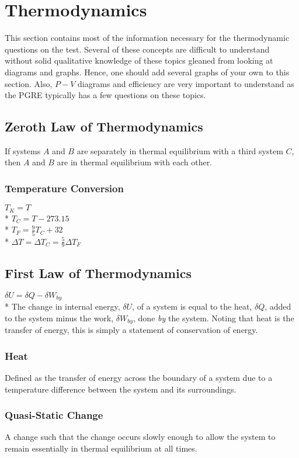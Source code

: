\section{Thermodynamics}
This section contains most of the information necessary for the thermodynamic questions on the test.
Several of these concepts are difficult to understand without solid qualitative knowledge of these topics gleaned from looking at diagrams and graphs.
Hence, one should add several graphs of your own to this section.
Also, \(P-V\) diagrams and efficiency are very important to understand as the PGRE typically has a few questions on these topics.

\subsection{Zeroth Law of Thermodynamics}
If systems \(A\) and \(B\) are separately in thermal equilibrium with a third system \(C\), then \(A\) and \(B\) are in thermal equilibrium with each other.

\subsubsection{Temperature Conversion}
\(T_{K}=T\)\\*
\(T_{C}=T-273.15\)\\*
\(T_{F}=\frac{9}{5}T_{C}+32\)\\*
\(\Delta T=\Delta T_{C}=\frac{5}{9}\Delta T_{F}\)

\subsection{First Law of Thermodynamics}
\(\displaystyle\delta U=\delta Q-\delta W_{by}\)\\*
The change in internal energy, \(\delta U\), of a system is equal to the heat, \(\delta Q\), added to the system minus the work, \(\delta W_{by}\), done \emph{by} the system.
Noting that heat is the transfer of energy, this is simply a statement of conservation of energy.

\subsubsection{Heat}
Defined as the transfer of energy across the boundary of a system due to a temperature difference between the system and its surroundings.

\subsubsection{Quasi-Static Change}
A change such that the change occurs slowly enough to allow the system to remain essentially in thermal equilibrium at all times.


